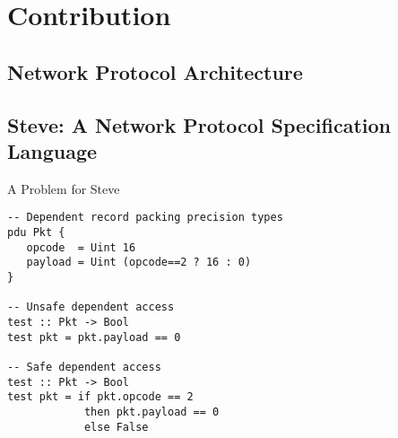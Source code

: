 \section{Contribution}

\subsection{Network Protocol Architecture}



\subsection{Steve: A Network Protocol Specification Language}

\begin{frame}[fragile]{A Problem for Steve}
\begin{verbatim}
-- Dependent record packing precision types
pdu Pkt {
   opcode  = Uint 16
   payload = Uint (opcode==2 ? 16 : 0)
}

-- Unsafe dependent access
test :: Pkt -> Bool
test pkt = pkt.payload == 0

-- Safe dependent access
test :: Pkt -> Bool
test pkt = if pkt.opcode == 2 
            then pkt.payload == 0 
            else False
\end{verbatim}
\end{frame}


